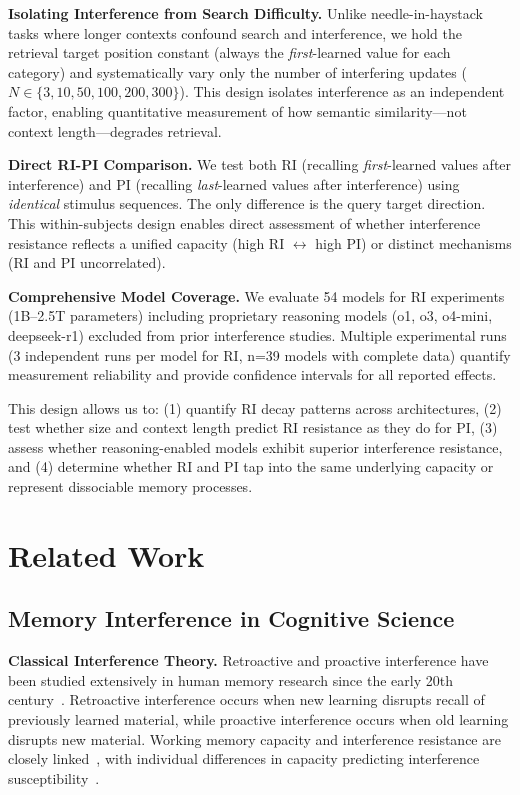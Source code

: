 \documentclass{article}
\begin{document}
\textbf{Isolating Interference from Search Difficulty.} Unlike needle-in-haystack tasks where longer contexts confound search and interference, we hold the retrieval target position constant (always the \textit{first}-learned value for each category) and systematically vary only the number of interfering updates ($N \in \{3, 10, 50, 100, 200, 300\}$). This design isolates interference as an independent factor, enabling quantitative measurement of how semantic similarity---not context length---degrades retrieval.

\textbf{Direct RI-PI Comparison.} We test both RI (recalling \textit{first}-learned values after interference) and PI (recalling \textit{last}-learned values after interference) using \textit{identical} stimulus sequences. The only difference is the query target direction. This within-subjects design enables direct assessment of whether interference resistance reflects a unified capacity (high RI $\leftrightarrow$ high PI) or distinct mechanisms (RI and PI uncorrelated).

\textbf{Comprehensive Model Coverage.} We evaluate 54 models for RI experiments (1B--2.5T parameters) including proprietary reasoning models (o1, o3, o4-mini, deepseek-r1) excluded from prior interference studies. Multiple experimental runs (3 independent runs per model for RI, n=39 models with complete data) quantify measurement reliability and provide confidence intervals for all reported effects.

This design allows us to: (1) quantify RI decay patterns across architectures, (2) test whether size and context length predict RI resistance as they do for PI, (3) assess whether reasoning-enabled models exhibit superior interference resistance, and (4) determine whether RI and PI tap into the same underlying capacity or represent dissociable memory processes.

\section{Related Work}

\subsection{Memory Interference in Cognitive Science}

\textbf{Classical Interference Theory.} Retroactive and proactive interference have been studied extensively in human memory research since the early 20th century~\citep{jenkins1924obliviscence, underwood1957interference}. Retroactive interference occurs when new learning disrupts recall of previously learned material, while proactive interference occurs when old learning disrupts new material. Working memory capacity and interference resistance are closely linked~\citep{baddeley1974working, cowan2001capacity}, with individual differences in capacity predicting interference susceptibility~\citep{engle2002working}.
\end{document}
